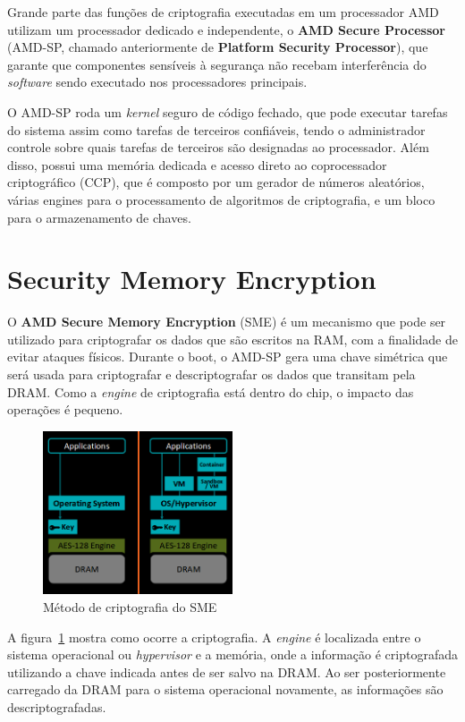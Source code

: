 \documentclass{report}
\begin{document}
Grande parte das funções de criptografia executadas em um processador AMD
utilizam um processador dedicado e independente, o \textbf{AMD Secure
Processor} (AMD-SP, chamado anteriormente de \textbf{Platform Security
Processor}), que garante que componentes sensíveis à segurança não recebam
interferência do \textit{software} sendo executado nos processadores
principais.

O AMD-SP roda um \textit{kernel} seguro de código fechado, que pode executar
tarefas do sistema assim como tarefas de terceiros confiáveis, tendo o
administrador controle sobre quais tarefas de terceiros são designadas ao
processador. Além disso, possui uma memória dedicada e acesso direto ao
coprocessador criptográfico (CCP), que é composto por um gerador de números
aleatórios, várias engines para o processamento de algoritmos de criptografia,
e um bloco para o armazenamento de chaves.

\section{Security Memory Encryption}

O \textbf{AMD Secure Memory Encryption} (SME) é um mecanismo que pode ser
utilizado para criptografar os dados que são escritos na RAM, com a finalidade
de evitar ataques físicos. Durante o boot, o AMD-SP gera uma chave simétrica
que será usada para criptografar e descriptografar os dados que transitam pela
DRAM\@. Como a \textit{engine} de criptografia está dentro do chip, o impacto
das operações é pequeno.

\begin{figure}[h]
    \centering
    \includegraphics[width=0.5\textwidth]{img/sme}
    \caption{Método de criptografia do SME}\label{sme-1}
\end{figure}

A figura~\ref{sme-1} mostra como ocorre a criptografia. A \textit{engine} é
localizada entre o sistema operacional ou \textit{hypervisor} e a memória, onde
a informação é criptografada utilizando a chave indicada antes de ser salvo na
DRAM. Ao ser posteriormente carregado da DRAM para o sistema operacional
novamente, as informações são descriptografadas.
\end{document}
